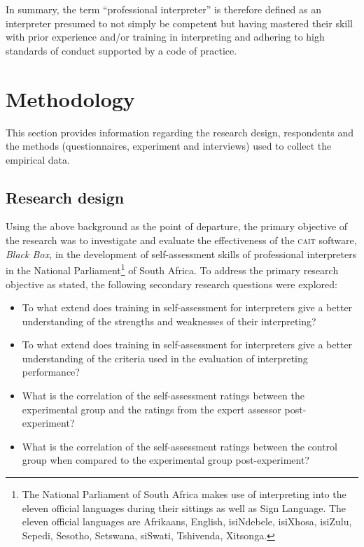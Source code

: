 \documentclass[output=paper]{langsci/langscibook}
\begin{document}
In summary, the term “professional interpreter” is therefore defined as an interpreter presumed to not simply be competent but having mastered their skill with prior experience and/or training in interpreting and adhering to high standards of conduct supported by a code of practice. 

\section{Methodology}
This section provides information regarding the research design, respondents and the methods (questionnaires, experiment and interviews) used to collect the empirical data. 

\subsection{Research design} 
Using the above background as the point of departure, the primary objective of the research was to investigate and evaluate the effectiveness of the \textsc{cait} software, \textit{Black Box,} in the development of self-assessment skills of professional interpreters in the National Parliament\footnote{The National Parliament of South Africa makes use of interpreting into the eleven official languages during their sittings as well as Sign Language. The eleven official languages are Afrikaans, English, isiNdebele, isiXhosa, isiZulu, Sepedi, Sesotho, Setswana, siSwati, Tshivenda, Xitsonga.}  of South Africa. To address the primary research objective as stated, the following secondary research questions were explored:

\begin{itemize}
\item To what extend does training in self-assessment for interpreters give a better understanding of the strengths and weaknesses of their interpreting?
\item To what extend does training in self-assessment for interpreters give a better understanding of the criteria used in the evaluation of interpreting performance?
\item What is the correlation of the self-assessment ratings between the experimental group and the ratings from the expert assessor post-experiment?
\item What is the correlation of the self-assessment ratings between the control group when compared to the experimental group post-experiment?
\end{itemize}
\end{document}
